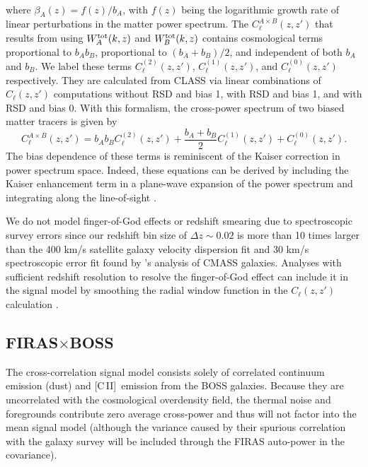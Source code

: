 \documentclass[fleqn,usenatbib]{mnras}
\newcommand{\cii}{[C{\sc\,II}]}
\newcommand{\FB}{FIRAS${\times}$BOSS}
\begin{document}
\\
where $\beta_A(z) = f(z)/b_A$, with $f(z)$ being the logarithmic growth rate of linear perturbations in the matter power spectrum.  The $C_{\ell}^{A\times B}(z,z')$ that results from using $W_A^{\rm tot}(k, z)$ and $W_B^{\rm tot}(k, z)$ contains cosmological terms proportional to $b_A b_B$, proportional to $(b_A {+} b_B)/2$, and independent of both $b_A$ and $b_B$. We label these terms $C_{\ell}^{(2)}(z,z')$, $C_{\ell}^{(1)}(z,z')$, and $C_{\ell}^{(0)}(z,z')$ respectively. They are calculated from CLASS via linear combinations of $C_{\ell}(z,z')$ computations without RSD and bias 1, with RSD and bias 1, and with RSD and bias 0. With this formalism, the cross-power spectrum of two biased matter tracers is given by 
\begin{equation}
C_{\ell}^{A\times B}(z,z') = b_A b_B C_{\ell}^{(2)}(z,z') + \frac{b_A {+} b_B}{2}C_{\ell}^{(1)}(z,z') + C_{\ell}^{(0)}(z,z').
\end{equation}
The bias dependence of these terms is reminiscent of the Kaiser correction in power spectrum space. Indeed, these equations can be derived by including the Kaiser enhancement term in a plane-wave expansion of the power spectrum and integrating along the line-of-sight \citep{padmanabhan2007clustering}.

We do not model finger-of-God effects or redshift smearing due to spectroscopic survey errors since our redshift bin size of $\Delta z \sim 0.02$ is more than 10 times larger than the 400 km/s satellite galaxy velocity dispersion fit and 30 km/s spectroscopic error fit found by \cite{Guo:2014iga}'s analysis of CMASS galaxies. Analyses with sufficient redshift resolution to resolve the finger-of-God effect can include it in the signal model by smoothing the radial window function in the $C_{\ell}(z,z')$ calculation \citep{2019MNRAS.485..326L, 2020PhRvD.102h3521G}.

\subsection{\texorpdfstring{\FB}{FIRASxBOSS}}\label{subsec:cross-power}
The cross-correlation signal model consists solely of correlated continuum emission (dust) and \cii\ emission from the BOSS galaxies. Because they are uncorrelated with the cosmological overdensity field, the thermal noise and foregrounds contribute zero average cross-power and thus will not factor into the mean signal model (although the variance caused by their spurious correlation with the galaxy survey will be included through the FIRAS auto-power in the covariance).  
\end{document}
